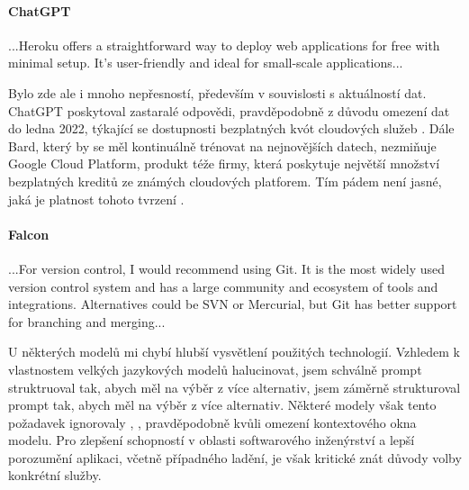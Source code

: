 \documentclass[FM,DP]{tulthesis}
\begin{document}
		\vspace{0.6em}
		\begin{tcolorbox}[colback=white,colframe=black]
			\paragraph{ChatGPT}
			...Heroku offers a straightforward way to deploy web applications for free with minimal setup. It's user-friendly and ideal for small-scale applications... \cite{chatgpt_navrh}
		\end{tcolorbox}
		\vspace{0.6em}
		
		Bylo zde ale i mnoho nepřesností, především v souvislosti s aktuálností dat. ChatGPT poskytoval zastaralé odpovědi, pravděpodobně z důvodu omezení dat do ledna 2022, týkající se dostupnosti bezplatných kvót cloudových služeb \cite{chatgpt_navrh} \cite{chatgpt_knowledge}. Dále Bard, který by se měl kontinuálně trénovat na nejnovějších datech, nezmiňuje Google Cloud Platform, produkt téže firmy, která poskytuje největší množství bezplatných kreditů ze známých cloudových platforem. Tím pádem není jasné, jaká je platnost tohoto tvrzení \cite{bard_navrh} \cite{GCP} \cite{Heroku}.
		
		\vspace{0.6em}
		\begin{tcolorbox}[colback=white,colframe=black]
			\paragraph{Falcon}
			...For version control, I would recommend using Git. It is the most widely used version control system and has a large community and ecosystem of tools and integrations. Alternatives could be SVN or Mercurial, but Git has better support for branching and merging... \cite{falcon_navrh}
		\end{tcolorbox}
		\vspace{0.6em}
		
		U některých modelů mi chybí hlubší vysvětlení použitých technologií. Vzhledem k vlastnostem velkých jazykových modelů halucinovat, jsem schválně prompt struktruoval tak, abych měl na výběr z více alternativ,  jsem záměrně strukturoval prompt tak, abych měl na výběr z více alternativ. Některé modely však tento požadavek ignorovaly \cite{gitCopilot_navrh}, \cite{falcon_navrh}, pravděpodobně kvůli omezení kontextového okna modelu. Pro zlepšení schopností v oblasti softwarového inženýrství a lepší porozumění aplikaci, včetně případného ladění, je však kritické znát důvody volby konkrétní služby.
		
\end{document}
